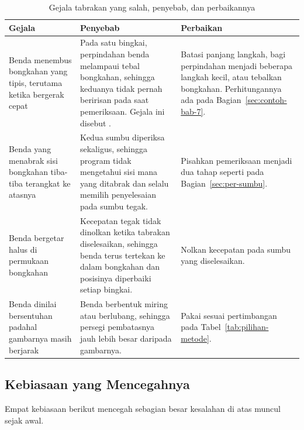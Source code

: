 \begin{table}[htbp]
\centering
\caption{Gejala tabrakan yang salah, penyebab, dan perbaikannya}
\label{tab:gejala-tabrakan}
{\setlength{\tabcolsep}{4pt}\footnotesize%
\begin{tabularx}{\textwidth}{@{}L{3.4cm} L{4.2cm} Y@{}}
\toprule
\headrow \textbf{Gejala} & \textbf{Penyebab} & \textbf{Perbaikan} \\
\midrule
Benda menembus bongkahan yang tipis, terutama ketika bergerak cepat &
Pada satu bingkai, perpindahan benda melampaui tebal bongkahan, sehingga
keduanya tidak pernah beririsan pada saat pemeriksaan. Gejala ini disebut
. &
Batasi panjang langkah, bagi perpindahan menjadi beberapa langkah kecil, atau
tebalkan bongkahan. Perhitungannya ada pada
Bagian~\ref{sec:contoh-bab-7}. \\
\addlinespace
Benda yang menabrak sisi bongkahan tiba-tiba terangkat ke atasnya &
Kedua sumbu diperiksa sekaligus, sehingga program tidak mengetahui sisi mana
yang ditabrak dan selalu memilih penyelesaian pada sumbu tegak. &
Pisahkan pemeriksaan menjadi dua tahap seperti pada
Bagian~\ref{sec:per-sumbu}. \\
\addlinespace
Benda bergetar halus di permukaan bongkahan &
Kecepatan tegak tidak dinolkan ketika tabrakan diselesaikan, sehingga benda
terus tertekan ke dalam bongkahan dan posisinya diperbaiki setiap bingkai. &
Nolkan kecepatan pada sumbu yang diselesaikan. \\
\addlinespace
Benda dinilai bersentuhan padahal gambarnya masih berjarak &
Benda berbentuk miring atau berlubang, sehingga persegi pembatasnya jauh lebih
besar daripada gambarnya. &
Pakai  sesuai pertimbangan pada
Tabel~\ref{tab:pilihan-metode}. \\
\bottomrule
\end{tabularx}}
\end{table}

\subsection{Kebiasaan yang Mencegahnya}

Empat kebiasaan berikut mencegah sebagian besar kesalahan di atas muncul sejak
awal.

